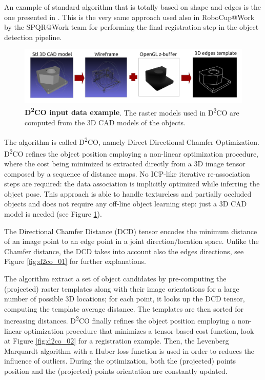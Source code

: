 An example of standard algorithm that is totally based on shape and edges is the one presented in \cite{imperoli2015d2co}. This is the very same approach used also in RoboCup@Work by the SPQR@Work team for performing the final registration step in the object detection pipeline. 

\begin{figure}
    \centering
    \includegraphics[width=\textwidth]{figures/1_perception_and_sensing_in_robotics/d2co_00}
    \caption{\textbf{D\textsuperscript{2}CO input data example}. The raster models used in D\textsuperscript{2}CO are computed from the 3D CAD models of the objects.} 
    \label{fig:d2co_00}
\end{figure}

The algorithm is called D\textsuperscript{2}{CO}, namely Direct Directional Chamfer Optimization. D\textsuperscript{2}CO refines the object position employing a non-linear optimization procedure, where the cost being minimized is extracted directly from a 3D image tensor composed by a sequence of distance maps. No ICP-like iterative re-association steps are required: the data association is implicitly optimized while inferring the object pose. This approach is able to handle textureless and partially occluded objects and does not require any off-line object learning step: just a 3D CAD model is needed (see Figure \ref{fig:d2co_00}).

The Directional Chamfer Distance (DCD) tensor encodes the minimum distance of an image point to an edge point in a joint direction/location space. Unlike the Chamfer distance, the DCD takes into account also the edges directions, see Figure \ref{fig:d2co_01} for further explanations.

The algorithm extract a set of object candidates by pre-computing the (projected) raster templates along with their image orientations for a large number of possible 3D locations; for each point, it looks up the DCD tensor, computing the template average distance. The templates are then sorted for increasing distances. D\textsuperscript{2}CO finally refines the object position employing a non-linear optimization procedure that minimizes a tensor-based cost function, look at Figure \ref{fig:d2co_02} for a registration example. Then, the Levenberg Marquardt algorithm with a Huber loss function is used in order to reduces the influence of outliers. During the optimization, both the (projected) points position and the (projected) points orientation are constantly updated.

